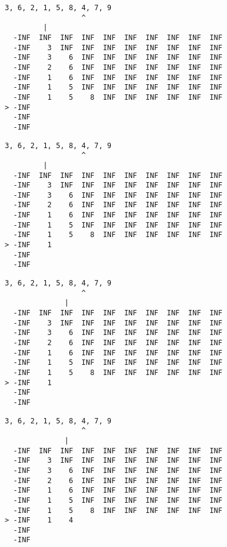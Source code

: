 { \begin{verbatim}
3, 6, 2, 1, 5, 8, 4, 7, 9
                  ^
         |
  -INF  INF  INF  INF  INF  INF  INF  INF  INF  INF
  -INF    3  INF  INF  INF  INF  INF  INF  INF  INF
  -INF    3    6  INF  INF  INF  INF  INF  INF  INF
  -INF    2    6  INF  INF  INF  INF  INF  INF  INF
  -INF    1    6  INF  INF  INF  INF  INF  INF  INF
  -INF    1    5  INF  INF  INF  INF  INF  INF  INF
  -INF    1    5    8  INF  INF  INF  INF  INF  INF
> -INF                                             
  -INF                                             
  -INF                                             
\end{verbatim} }

{ \begin{verbatim}
3, 6, 2, 1, 5, 8, 4, 7, 9
                  ^
         |
  -INF  INF  INF  INF  INF  INF  INF  INF  INF  INF
  -INF    3  INF  INF  INF  INF  INF  INF  INF  INF
  -INF    3    6  INF  INF  INF  INF  INF  INF  INF
  -INF    2    6  INF  INF  INF  INF  INF  INF  INF
  -INF    1    6  INF  INF  INF  INF  INF  INF  INF
  -INF    1    5  INF  INF  INF  INF  INF  INF  INF
  -INF    1    5    8  INF  INF  INF  INF  INF  INF
> -INF    1                                        
  -INF                                             
  -INF                                             
\end{verbatim} }

{ \begin{verbatim}
3, 6, 2, 1, 5, 8, 4, 7, 9
                  ^
              |
  -INF  INF  INF  INF  INF  INF  INF  INF  INF  INF
  -INF    3  INF  INF  INF  INF  INF  INF  INF  INF
  -INF    3    6  INF  INF  INF  INF  INF  INF  INF
  -INF    2    6  INF  INF  INF  INF  INF  INF  INF
  -INF    1    6  INF  INF  INF  INF  INF  INF  INF
  -INF    1    5  INF  INF  INF  INF  INF  INF  INF
  -INF    1    5    8  INF  INF  INF  INF  INF  INF
> -INF    1                                        
  -INF                                             
  -INF                                             
\end{verbatim} }

{ \begin{verbatim}
3, 6, 2, 1, 5, 8, 4, 7, 9
                  ^
              |
  -INF  INF  INF  INF  INF  INF  INF  INF  INF  INF
  -INF    3  INF  INF  INF  INF  INF  INF  INF  INF
  -INF    3    6  INF  INF  INF  INF  INF  INF  INF
  -INF    2    6  INF  INF  INF  INF  INF  INF  INF
  -INF    1    6  INF  INF  INF  INF  INF  INF  INF
  -INF    1    5  INF  INF  INF  INF  INF  INF  INF
  -INF    1    5    8  INF  INF  INF  INF  INF  INF
> -INF    1    4                                   
  -INF                                             
  -INF                                             
\end{verbatim} }

